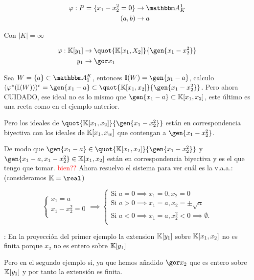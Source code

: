 \begin{example}
	\begin{align*}
	\varphi: P=\{ x_1-x_2^2=0 \} & \rightarrow \A^1_K \\
	(a,b) & \rightarrow a
	\end{align*}

	Con $|K|=\infty$

	\begin{align*}
	\varphi: \K[y_1] & \rightarrow \quot{\K[x_1,X_2]}{\gen{x_1-x_2^2}} \\
	y_1 & \rightarrow \cls{x_1}
	\end{align*}

	Sea $W=\{a\} \subset \A^K_1$, entonces $\I(W) = \gen{y_1-a}$, calculo $(\varphi^*(\I(W)))^e=\gen{x_1-a} \subset \quot{\K[x_1,x_2]}{\gen{x_1-x_2^2}}$. Pero ahora CUIDADO, ese ideal no es lo mismo que $\gen{x_1-a} \subset \K[x_1,x_2]$, este último es una recta como en el ejemplo anterior.

	Pero los ideales de $\quot{\K[x_1,x_2]}{\gen{x_1-x_2^2}}$ están en correspondencia biyectiva con los ideales de $\mathbb{K}[x_1,x_w]$ que contengan a $\gen{x_1-x_2^2}$.

	De modo que $\gen{x_1-a} \in \quot{\K[x_1,x_2]}{\gen{x_1-x_2^2}} $ y $ \gen{x_1-a,x_1-x_2^2} \in \K[x_1,x_2]$ están en correspondencia biyectiva y es el que tengo que tomar. \textcolor{red}{bien??} Ahora resuelvo el sistema para ver cuál es la v.a.a.: (consideramos $\K=\real$)

	$$
	\left\{ \begin{array}{c}
	x_1=a \\
	x_1-x_2^2=0\\
	\end{array} \right.
	\implies
	\left\{ \begin{array}{c}
	\text{Si } a=0 \implies x_1=0, x_2=0 \\
	\text{Si } a >0 \implies x_1=a, x_2=\pm \sqrt{a}\\
	\text{Si } a < 0 \implies x_1=a, x_2^2<0 \implies \emptyset.\\
	\end{array} \right.
	$$


\end{example}

\obs: En la proyección del primer ejemplo la extension $\mathbb{K}[y_1]$ sobre $\mathbb{K}[x_1,x_2]$ no es finita porque $x_2$ no es entero sobre $\mathbb{K}[y_1]$

Pero en el segundo ejemplo si, ya que hemos añadido $\cls{x_2}$ que es entero  sobre $\mathbb{K}[y_1]$ y por tanto la extensión es finita.

